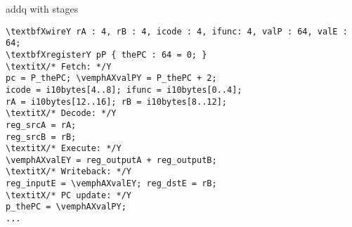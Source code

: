 \begin{frame}[fragile,label=addqWithStages]{addq with stages}
\begin{Verbatim}[fontsize=\fontsize{11}{12}\selectfont,commandchars=\\XY]
\textbfXwireY rA : 4, rB : 4, icode : 4, ifunc: 4, valP : 64, valE : 64;
\textbfXregisterY pP { thePC : 64 = 0; }
\textitX/* Fetch: */Y
pc = P_thePC; \vemphAXvalPY = P_thePC + 2;
icode = i10bytes[4..8]; ifunc = i10bytes[0..4];
rA = i10bytes[12..16]; rB = i10bytes[8..12];
\textitX/* Decode: */Y
reg_srcA = rA;
reg_srcB = rB;
\textitX/* Execute: */Y
\vemphAXvalEY = reg_outputA + reg_outputB;
\textitX/* Writeback: */Y
reg_inputE = \vemphAXvalEY; reg_dstE = rB;
\textitX/* PC update: */Y
p_thePC = \vemphAXvalPY;
...
\end{Verbatim}
\end{frame}
